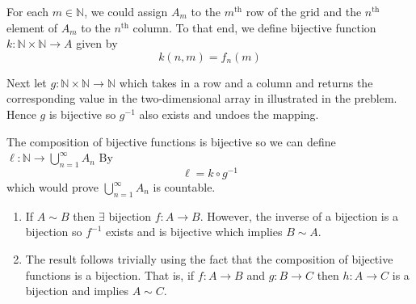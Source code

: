 \begin{enumerate}[label=(\alph*)]
   For each $m\in \mathbb{N}$, we could assign $A_m$ to the $m^{\text{th}}$ row
   of the grid and the $n^{\text{th}}$ element of $A_m$ to the $n^{\text{th}}$ 
   column. To that end, we define bijective function $k : \mathbb{N} \times \mathbb{N} \rightarrow A$ given by
   \begin{equation*}
        k(n,m) = f_n(m)
   \end{equation*}

   Next let $g: \mathbb{N} \times \mathbb{N} \rightarrow \mathbb{N}$ which 
   takes in a row and a column and returns the corresponding value in the 
   two-dimensional array in illustrated in the preblem. Hence $g$ is bijective 
   so $g^{-1}$ also exists and undoes the mapping.
   
   The composition of bijective functions is bijective so we can define
   $\ell : \mathbb{N} \rightarrow \bigcup_{n=1}^\infty A_n$ By
   \begin{equation*}
        \ell = k \circ g^{-1}
   \end{equation*}
   which would prove $\bigcup_{n=1}^\infty A_n$ is countable.
    
\end{enumerate}

\begin{enumerate}[label=(\alph*)]
    \item 
    If $A \sim B$ then $\exists$ bijection $f: A\rightarrow B$. However, 
    the inverse of a bijection is a bijection so $f^{-1}$ exists and is bijective
    which implies $B\sim A$.

    \item
    The result follows trivially using the fact that the composition of 
    bijective functions is a bijection. That is, if $f:A \rightarrow B$ and 
    $g:B \rightarrow C$ then $h:A\rightarrow C$ is a bijection and implies $A \sim C$.
\end{enumerate}

